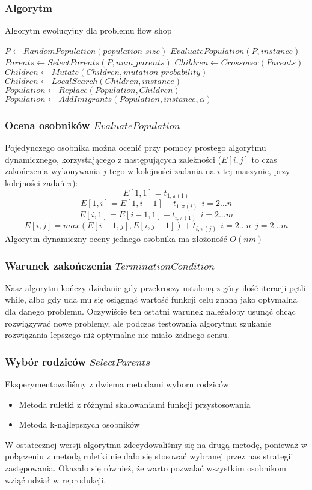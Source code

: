 \documentclass[10pt]{beamer}
\begin{document}
\frame
{
  \frametitle{Algorytm}

\begin{algorithm}[H]
\caption{Algorytm ewolucyjny dla problemu flow shop}
\label{algorytm}
\begin{algorithmic}
  \State $P \gets RandomPopulation(population\_size)$
  \State $EvaluatePopulation(P, instance)$
    \State $Parents \gets SelectParents(P, num\_parents)$ 
    \State $Children \gets Crossover(Parents)$
    \State $Children \gets Mutate(Children, mutation\_probability)$
    \State $Children \gets LocalSearch(Children, instance)$
    \State $Population \gets Replace(Population, Children)$
    \State $Population \gets AddImigrants(Population, instance, \alpha)$
  \EndWhile
\end{algorithmic}
\end{algorithm}
}

\frame
{
\frametitle{Ocena osobników $EvaluatePopulation$}

 Pojedynczego osobnika można ocenić przy pomocy prostego algorytmu dynamicznego, korzystającego
z następujących zależności ($E[i,j]$ to czas zakończenia wykonywania $j$-tego w kolejności zadania
na $i$-tej maszynie, przy kolejności zadań $\pi$):
$$ E[1, 1] = t_{1,\pi(1)} $$
$$ E[1, i] = E[1, i-1] + t_{1,\pi(i)}\ \  i = 2 \ldots n$$
$$ E[i, 1] = E[i-1, 1] + t_{i,\pi(1)}\ \  i = 2 \ldots m$$
$$ E[i, j] = max(E[i-1, j], E[i, j-1]) + t_{i, \pi(j)} \ \ i = 2 \ldots n \ \ j = 2 \ldots m $$
Algorytm dynamiczny oceny jednego osobnika ma złożoność $O(nm)$

}

\frame
{
\frametitle{Warunek zakończenia $TerminationCondition$}
Nasz algorytm kończy działanie gdy przekroczy ustaloną z góry ilość iteracji pętli while, albo
gdy uda mu się osiągnąć wartość funkcji celu znaną jako optymalna dla danego problemu. Oczywiście
ten ostatni warunek należałoby usunąć chcąc rozwiązywać nowe problemy, ale podczas testowania 
algorytmu szukanie rozwiązania lepszego niż optymalne nie miało żadnego sensu.

}

\frame
{
\frametitle{Wybór rodziców $SelectParents$}
Eksperymentowaliśmy z dwiema metodami wyboru rodziców:
\begin{itemize}
  \item Metoda ruletki z różnymi skalowaniami funkcji przystosowania
  \item Metoda k-najlepszych osobników
\end{itemize}
W ostatecznej wersji algorytmu zdecydowaliśmy się na drugą metodę, ponieważ
w połączeniu z metodą ruletki nie dało się stosować wybranej przez nas strategii zastępowania. Okazało 
się również, że warto pozwalać wszystkim osobnikom wziąć udział w reprodukcji.
}
\end{document}
